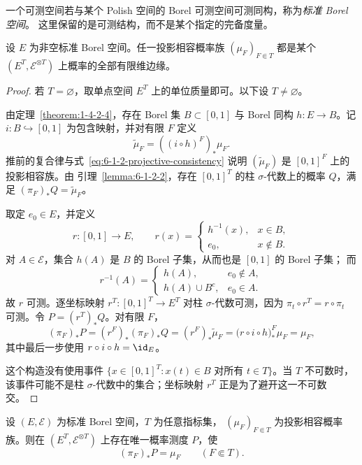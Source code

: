 \begin{definition}\label{def:6-1-2-3}
一个可测空间若与某个 Polish 空间的 Borel 可测空间可测同构，称为\emph{标准 Borel 空间}。
这里保留的是可测结构，而不是某个指定的完备度量。
\end{definition}

\begin{proposition}\label{proposition:6-1-2-3}
设 $E$ 为非空标准 Borel 空间。任一投影相容概率族
$(\mu_F)_{F\Subset T}$ 都是某个
$(E^T,\mathcal E^{\otimes T})$ 上概率的全部有限维边缘。
\end{proposition}

\begin{proof}
若 $T=\varnothing$，取单点空间 $E^T$ 上的单位质量即可。以下设 $T\ne\varnothing$。

由定理~\ref{theorem:1-4-2-4}，存在 Borel 集 $B\subset[0,1]$ 与 Borel 同构
$h:E\to B$。记 $i:B\hookrightarrow[0,1]$ 为包含映射，并对有限 $F$ 定义
\[
  \widetilde\mu_F=((i\circ h)^F)_*\mu_F.
\]
推前的复合律与式~\eqref{eq:6-1-2-projective-consistency} 说明
$(\widetilde\mu_F)$ 是 $[0,1]^F$ 上的投影相容族。由
引理~\ref{lemma:6-1-2-2}，存在 $[0,1]^T$ 的柱 $\sigma$-代数上的概率 $Q$，满足
$(\pi_F)_*Q=\widetilde\mu_F$。

取定 $e_0\in E$，并定义
\[
 r:[0,1]\longrightarrow E,
 \qquad
 r(x)=
 \begin{cases}
   h^{-1}(x),&x\in B,\\
   e_0,&x\notin B.
 \end{cases}
 \tag{6.1.5}\label{eq:6-1-2-retraction}
\]
对 $A\in\mathcal E$，集合 $h(A)$ 是 $B$ 的 Borel 子集，从而也是 $[0,1]$ 的 Borel 子集；
而
\[
 r^{-1}(A)=
 \begin{cases}
   h(A),&e_0\notin A,\\
   h(A)\cup B^c,&e_0\in A.
 \end{cases}
\]
故 $r$ 可测。逐坐标映射
$r^T:[0,1]^T\to E^T$ 对柱 $\sigma$-代数可测，因为
$\pi_t\circ r^T=r\circ\pi_t$ 可测。令 $P=(r^T)_*Q$。对有限 $F$，
\[
 (\pi_F)_*P
 =(r^F)_*(\pi_F)_*Q
 =(r^F)_*\widetilde\mu_F
 =\bigl(r\circ i\circ h\bigr)^F_*\mu_F
 =\mu_F,
\]
其中最后一步使用 $r\circ i\circ h=\id_E$。

这个构造没有使用事件
$\{x\in[0,1]^T:x(t)\in B\text{ 对所有 }t\in T\}$。当 $T$ 不可数时，该事件可能不是柱
$\sigma$-代数中的集合；坐标映射 $r^T$ 正是为了避开这一不可数交。
\end{proof}

\begin{theorem}\label{theorem:6-1-2-1}
设 $(E,\mathcal E)$ 为标准 Borel 空间，$T$ 为任意指标集，
$(\mu_F)_{F\Subset T}$ 为投影相容概率族。则在
$(E^T,\mathcal E^{\otimes T})$ 上存在唯一概率测度 $P$，使
\[
  (\pi_F)_*P=\mu_F\qquad (F\Subset T).
\]
\end{theorem}

